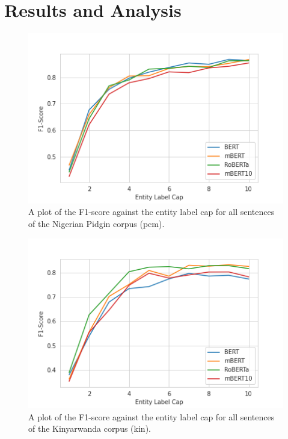 \documentclass{article}
\begin{document}
\section{Results and Analysis}
\label{sec:res}

\begin{figure}
    \centering
    \includegraphics[width=\columnwidth]{images/pcm_models_plot.png}
    \caption{A plot of the F1-score against the entity label cap for all sentences of the Nigerian Pidgin corpus (pcm).}
    \label{fig:pcm_plot}
\end{figure}

\begin{figure}
    \centering
    \includegraphics[width=\columnwidth]{images/kin_models_plot.png}
    \caption{A plot of the F1-score against the entity label cap for all sentences of the Kinyarwanda corpus (kin).}
    \label{fig:kin_plot}
\end{figure}
\end{document}
